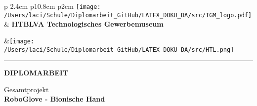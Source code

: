 \documentclass[titlepage,12pt,twoside]{article}
\begin{document}


\begin{titlepage}

	\begin{center}
	\begin{tabular}{p {2.4cm} p{10.8cm} p{2cm}}
	\texttt{[image: /Users/laci/Schule/Diplomarbeit\_GitHub/LATEX\_DOKU\_DA/src/TGM\_logo.pdf]}& \large{{\textbf{HTBLVA Technologisches Gewerbemuseum}}}\par\par{}&\texttt{[image: /Users/laci/Schule/Diplomarbeit\_GitHub/LATEX\_DOKU\_DA/src/HTL.png]}\\
	\end{tabular}
	\noindent\rule{1.1\textwidth}{1pt} 
	\end{center}
	
	\begin{center}
	
	\vspace*{1cm}
	\LARGE
	\textbf{DIPLOMARBEIT}
	
	\vspace{1.7cm}
	\normalsize
	Gesamtprojekt\\
	\LARGE
	\textbf{RoboGlove - Bionische Hand}\\
	\end{center}
	
	\vspace{1.7cm}
	
	\normalsize 
	\large
	

\end{titlepage}
\end{document}
